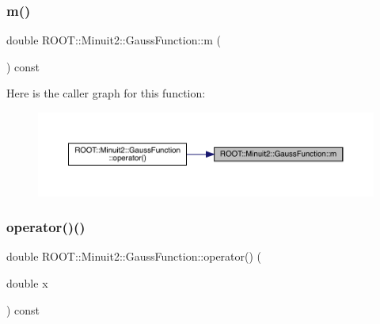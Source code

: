 \subsubsection{\texorpdfstring{m()}{m()}}
{\footnotesize\ttfamily double R\+O\+O\+T\+::\+Minuit2\+::\+Gauss\+Function\+::m (\begin{DoxyParamCaption}{ }\end{DoxyParamCaption}) const\hspace{0.3cm}{\ttfamily [inline]}}

Here is the caller graph for this function\+:\nopagebreak
\begin{figure}[H]
\begin{center}
\leavevmode
\includegraphics[width=350pt]{d7/d62/classROOT_1_1Minuit2_1_1GaussFunction_a746dc27d10faf57599e9a0a5bc232a1d_icgraph}
\end{center}
\end{figure}
\mbox{\label{classROOT_1_1Minuit2_1_1GaussFunction_a5fe07f3350b17d79583af7b844ded399}} 
\subsubsection{\texorpdfstring{operator()()}{operator()()}}
{\footnotesize\ttfamily double R\+O\+O\+T\+::\+Minuit2\+::\+Gauss\+Function\+::operator() (\begin{DoxyParamCaption}\item[{double}]{x }\end{DoxyParamCaption}) const\hspace{0.3cm}{\ttfamily [inline]}}

